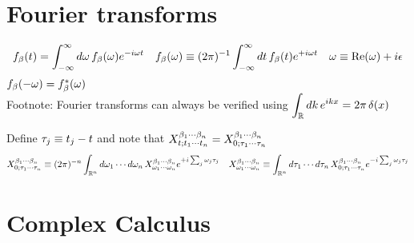 \documentclass[11pt]{article}
\numberwithin{equation}{section}
\begin{document}
\newpage
\section{Fourier transforms}


\begin{rmk}
\begin{align}
  f_\b(t)
=
  \int_{-\infty}^\infty
  d\w\,
  f_\b(\w)
  e^{-i\w t}
&&
  f_\b(\w)
\equiv
  (2\pi)^{-1}
  \int_{-\infty}^\infty
  dt\,
  f_\b(t)
  e^{+i\w t}
&&
  \w
\equiv
  \mr{Re}(\w)
+
  i\ev
\end{align}
$
  f_{\beta }(-\omega )
=
  f_{\beta }^*(\omega )
$\\
Footnote:
Fourier transforms can always be verified using
$\ds{
  \int_\mb{R}
  dk\,
  e^{ikx}
=
  2\pi\,\d(x)
}$
\end{rmk}


\begin{rmk}
Define $\tau _j\equiv t_j-t$
and note that
$
  X^{\beta _1\cdots \beta _n}_{t;t_1\cdots t_n}
=
  X^{\beta _1\cdots \beta _n}_{0;\tau _1\cdots \tau _n}
$
\begin{align}
  X^{\b_1\cd \b_n}_{0;\ta_1\cd \ta_n}
\equiv
  (2\pi)^{-n}
  \int_{\mb{R}^n}
  d\w_1\cd d\w_n\,
  X^{\b_1\cd \b_n}_{\w_1\cd\w_n}
  e^{+i\sum_j\w_j\ta_j}
&&
  X^{\b_1\cd \b_n}_{\w_1\cd\w_n}
\equiv
  \int_{\mb{R}^n}
  d\ta_1\cd d\ta_n\,
  X^{\b_1\cd \b_n}_{0;\ta_1\cd \ta_n}
  e^{-i\sum_j\w_j\ta_j}
\end{align}
\end{rmk}

\begin{rmk}
\end{rmk}

\newpage
\section{Complex Calculus}
\end{document}
